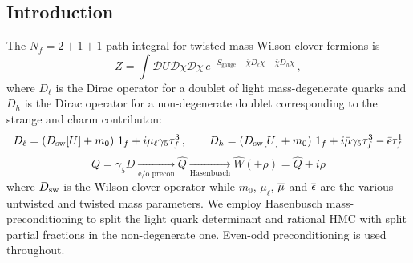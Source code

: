 \documentclass[a0,portrait]{a0poster}
\begin{document}
\begin{multicols}{2}
    \subsection*{Introduction}
    The $N_f =2+1+1$ path integral for twisted mass Wilson clover fermions \cite{Frezzotti:2003ni,Frezzotti:2004wz,Sheikholeslami:1985ij} is
    \begin{equation*}
      Z= \int \mathcal{D}U \mathcal{D}\chi \mathcal{D}\bar\chi \,e^{-S_\mathrm{gauge}-\bar \chi D_\ell\chi - \bar \chi D_h \chi } \,,
    \end{equation*}
    where $D_\ell$ is the Dirac operator for a doublet of light mass-degenerate quarks and $D_h$ is the Dirac operator for a non-degenerate doublet corresponding to the strange and charm contributon:
    \begin{equation*}
        D_\ell = (D_{\mathrm{sw}}[U] + m_0)\ 1_f + i \mu_\ell\gamma_5\tau^3_f\, ,\quad\quad
        D_h = (D_{\mathrm{sw}}[U] + m_0)\ 1_f + i\bar\mu\gamma_5\tau^3_f - \bar\epsilon \tau^1_f
    \end{equation*}
    \begin{equation*}
        Q = \gamma_5 D \underset{\text{e/o precon}}{\rightarrow} \hat{Q} \underset{\text{Hasenbusch}}{\rightarrow} \hat{W}(\pm\rho) = \hat{Q} \pm i\rho
    \end{equation*}
    where $D_{\mathrm{sw}}$ is the Wilson clover operator while $m_0$, $\mu_\ell$, $\overline{\mu}$ and $\overline{\epsilon}$ are the various untwisted and twisted mass parameters.
    We employ Hasenbusch mass-preconditioning \cite{Hasenbusch:2001ne} to split the light quark determinant and rational HMC \cite{Clark:2006fx} with split partial fractions in the non-degenerate one. Even-odd preconditioning is used throughout.


\end{multicols}
\end{document}
